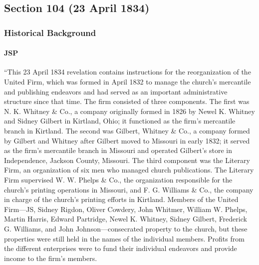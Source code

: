 \subsection{Section 104 (23 April 1834)}
	\label{DC104}
	
	\subsubsection{Historical Background}
		\label{DC104-HB}
		
		\paragraph{JSP}
		
			``This 23 April 1834 revelation contains instructions for the reorganization of the United Firm, which was formed in April 1832 to manage the church's mercantile and publishing endeavors and had served as an important administrative structure since that time. The firm consisted of three components. The first was N. K. Whitney \& Co., a company originally formed in 1826 by Newel K. Whitney and Sidney Gilbert in Kirtland, Ohio; it functioned as the firm's mercantile branch in Kirtland. The second was Gilbert, Whitney \& Co., a company formed by Gilbert and Whitney after Gilbert moved to Missouri in early 1832; it served as the firm's mercantile branch in Missouri and operated Gilbert's store in Independence, Jackson County, Missouri. The third component was the Literary Firm, an organization of six men who managed church publications. The Literary Firm supervised W. W. Phelps \& Co., the organization responsible for the church's printing operations in Missouri, and F. G. Williams \& Co., the company in charge of the church's printing efforts in Kirtland. Members of the United Firm---JS, Sidney Rigdon, Oliver Cowdery, John Whitmer, William W. Phelps, Martin Harris, Edward Partridge, Newel K. Whitney, Sidney Gilbert, Frederick G. Williams, and John Johnson---consecrated property to the church, but these properties were still held in the names of the individual members. Profits from the different enterprises were to fund their individual endeavors and provide income to the firm's members.
			
